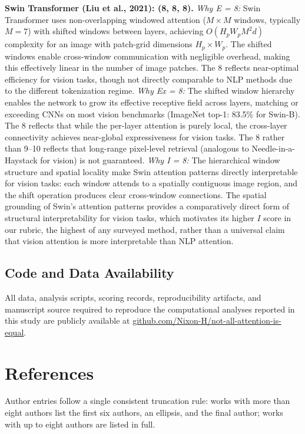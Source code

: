 \documentclass[10pt,twocolumn]{article}
\begin{document}
\textbf{Swin Transformer (Liu et al., 2021): (8, 8, 8).}
\textit{Why E = 8:} Swin Transformer uses non-overlapping windowed attention ($M \times M$ windows, typically $M = 7$) with shifted windows between layers, achieving $O(H_pW_pM^2d)$ complexity for an image with patch-grid dimensions $H_p\times W_p$. The shifted windows enable cross-window communication with negligible overhead, making this effectively linear in the number of image patches. The 8 reflects near-optimal efficiency for vision tasks, though not directly comparable to NLP methods due to the different tokenization regime. \textit{Why Ex = 8:} The shifted window hierarchy enables the network to grow its effective receptive field across layers, matching or exceeding CNNs on most vision benchmarks (ImageNet top-1: 83.5\% for Swin-B). The 8 reflects that while the per-layer attention is purely local, the cross-layer connectivity achieves near-global expressiveness for vision tasks. The 8 rather than 9--10 reflects that long-range pixel-level retrieval (analogous to Needle-in-a-Haystack for vision) is not guaranteed. \textit{Why I = 8:} The hierarchical window structure and spatial locality make Swin attention patterns directly interpretable for vision tasks: each window attends to a spatially contiguous image region, and the shift operation produces clear cross-window connections. The spatial grounding of Swin's attention patterns provides a comparatively direct form of structural interpretability for vision tasks, which motivates its higher $I$ score in our rubric, the highest of any surveyed method, rather than a universal claim that vision attention is more interpretable than NLP attention.

\FloatBarrier
\subsection*{Code and Data Availability}
All data, analysis scripts, scoring records, reproducibility artifacts, and manuscript source required to reproduce the computational analyses reported in this study are publicly available at \href{https://github.com/Nixon-H/not-all-attention-is-equal}{github.com/Nixon-H/not-all-attention-is-equal}.

\section*{References}

Author entries follow a single consistent truncation rule: works with more than eight authors list the first six authors, an ellipsis, and the final author; works with up to eight authors are listed in full.
\end{document}
